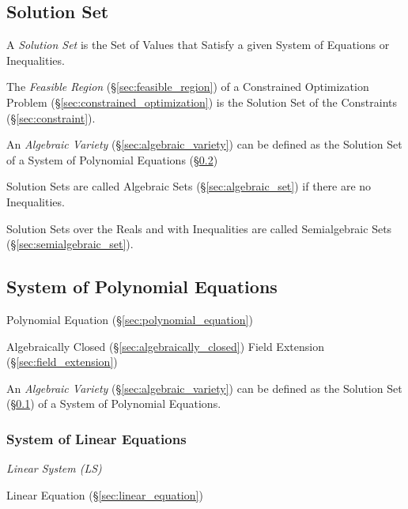 \subsection{Solution Set}\label{sec:solution_set}

A \emph{Solution Set} is the Set of Values that Satisfy a given System of
Equations or Inequalities.

The \emph{Feasible Region} (\S\ref{sec:feasible_region}) of a Constrained
Optimization Problem (\S\ref{sec:constrained_optimization}) is the Solution Set
of the Constraints (\S\ref{sec:constraint}).

An \emph{Algebraic Variety} (\S\ref{sec:algebraic_variety}) can be defined as
the Solution Set of a System of Polynomial Equations
(\S\ref{sec:polynomial_equation_system})

Solution Sets are called Algebraic Sets (\S\ref{sec:algebraic_set}) if there
are no Inequalities.

Solution Sets over the Reals and with Inequalities are called Semialgebraic
Sets (\S\ref{sec:semialgebraic_set}).



\subsection{System of Polynomial Equations}
\label{sec:polynomial_equation_system}

Polynomial Equation (\S\ref{sec:polynomial_equation})

Algebraically Closed (\S\ref{sec:algebraically_closed}) Field
Extension (\S\ref{sec:field_extension})

An \emph{Algebraic Variety} (\S\ref{sec:algebraic_variety}) can be defined as
the Solution Set (\S\ref{sec:solution_set}) of a System of Polynomial Equations.



\subsubsection{System of Linear Equations}\label{sec:linear_equation_system}

\emph{Linear System (LS)}

Linear Equation (\S\ref{sec:linear_equation})

